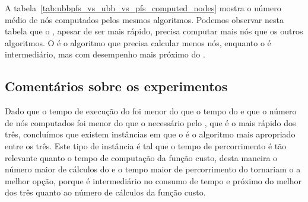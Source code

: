 A tabela~\ref{tab:ubbpfs_vs_ubb_vs_pfs_computed_nodes} mostra o número
médio de nós computados pelos mesmos algoritmos. Podemos observar nesta
tabela que o , apesar de ser mais rápido, precisa computar
mais nós que os outros algoritmos. O  é o algoritmo que 
precisa calcular menos nós, enquanto o  é 
intermediário, mas com desempenho mais próximo do .

\subsection{Comentários sobre os experimentos}
Dado que o tempo de execução do  foi menor do que o
tempo do  e que o número de nós computados foi menor do
que o necessário pelo , que é o mais rápido dos três, 
concluímos que existem instâncias em que o  é o 
algoritmo mais apropriado entre os três. Este tipo de instância é tal
que o tempo de percorrimento é tão relevante quanto o tempo de 
computação da função custo, desta maneira o número maior de cálculos
do  e o tempo maior de percorrimento do  
tornariam o  a melhor opção, porque é intermediário no 
consumo de tempo e próximo do melhor dos três quanto ao número de 
cálculos da função custo.

